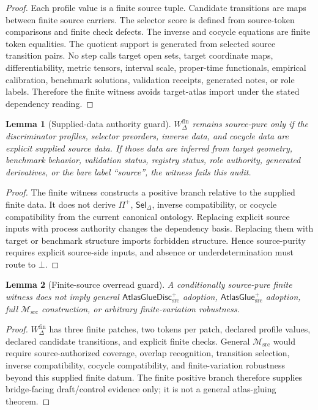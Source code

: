 \documentclass[11pt]{article}
\newcommand{\Msrc}{\mathcal{M}_{\mathrm{src}}}
\newcommand{\AtlasGlue}{\mathsf{AtlasGlue}_{\mathrm{src}}^{+}}
\newcommand{\AtlasGlueDisc}{\mathsf{AtlasGlueDisc}_{\mathrm{src}}^{+}}
\newcommand{\Prof}{\Pi^{+}}
\newcommand{\Sel}{\mathsf{Sel}_{\Delta}}
\newcommand{\Bot}{\bot}
\newcommand{\Wfin}{W_{\Delta}^{\mathrm{fin}}}
\newtheorem{lemma}{Lemma}
\begin{document}
\begin{proof}
Each profile value is a finite source tuple. Candidate transitions are maps
between finite source carriers. The selector score is defined from source-token
comparisons and finite check defects. The inverse and cocycle equations are
finite token equalities. The quotient support is generated from selected
source transition pairs. No step calls target open sets, target coordinate
maps, differentiability, metric tensors, interval scale, proper-time
functionals, empirical calibration, benchmark solutions, validation receipts,
generated notes, or role labels. Therefore the finite witness avoids
target-atlas import under the stated dependency reading.
\end{proof}

\begin{lemma}[Supplied-data authority guard]
\(\Wfin\) remains source-pure only if the discriminator profiles, selector
preorders, inverse data, and cocycle data are explicit supplied source data.
If those data are inferred from target geometry, benchmark behavior,
validation status, registry status, role authority, generated derivatives, or
the bare label ``source'', the witness fails this audit.
\end{lemma}

\begin{proof}
The finite witness constructs a positive branch relative to the supplied
finite data. It does not derive \(\Prof\), \(\Sel\), inverse compatibility, or
cocycle compatibility from the current canonical ontology. Replacing explicit
source inputs with process authority changes the dependency basis. Replacing
them with target or benchmark structure imports forbidden structure. Hence
source-purity requires explicit source-side inputs, and absence or
underdetermination must route to \(\Bot\).
\end{proof}

\begin{lemma}[Finite-source overread guard]
A conditionally source-pure finite witness does not imply general
\(\AtlasGlueDisc\) adoption, \(\AtlasGlue\) adoption, full \(\Msrc\)
construction, or arbitrary finite-variation robustness.
\end{lemma}

\begin{proof}
\(\Wfin\) has three finite patches, two tokens per patch, declared profile
values, declared candidate transitions, and explicit finite checks. General
\(\Msrc\) would require source-authorized coverage, overlap recognition,
transition selection, inverse compatibility, cocycle compatibility, and
finite-variation robustness beyond this supplied finite datum. The finite
positive branch therefore supplies bridge-facing draft/control evidence only;
it is not a general atlas-gluing theorem.
\end{proof}
\end{document}
